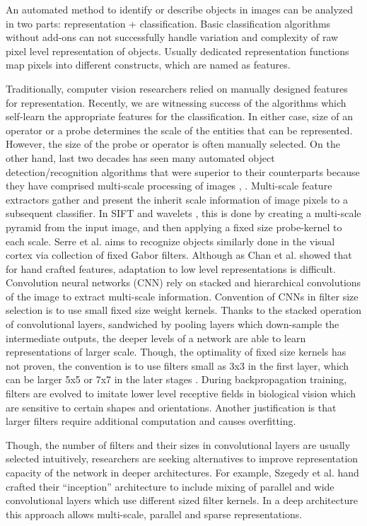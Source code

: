 \documentclass{bmvc2k}
\begin{document}
An automated method to identify or describe objects in images can be analyzed in two parts: representation + classification. Basic classification algorithms without add-ons can not successfully handle variation and complexity of raw pixel level representation of objects. Usually dedicated representation functions map pixels into different constructs, which are named as features.

Traditionally, computer vision researchers relied on manually designed features for representation. Recently, we are witnessing success of the algorithms which self-learn the appropriate features for the classification. In either case, size of an operator or a probe determines the scale of the entities that can be represented. However, the size of the probe or operator is often manually selected. On the other hand, last two decades has seen many automated object detection/recognition algorithms that were superior to their counterparts because they have comprised multi-scale processing of images \cite{dalal2005histograms}, \cite{lenet}. Multi-scale feature extractors gather and present the inherit scale information of image pixels to a subsequent classifier. In SIFT \cite{lowe} and wavelets \cite{mallat1992characterization}, this is done by creating a multi-scale pyramid from the input image, and then applying a fixed size probe-kernel to each scale. Serre et al. \cite{serre} aims to recognize objects similarly done in the visual cortex via collection of fixed Gabor filters. Although as Chan et al. \cite{pcanet} showed that for hand crafted features, adaptation to low level representations is difficult. Convolution neural networks (CNN) rely on stacked and hierarchical convolutions of the image to extract multi-scale information. Convention of CNNs in filter size selection is to use small fixed size weight kernels. Thanks to the stacked operation of convolutional layers, sandwiched by pooling layers which down-sample the intermediate outputs, the deeper levels of a network are able to learn representations of larger scale. Though, the optimality of fixed size kernels has not proven, the convention is to use filters small as 3x3 in the first layer, which can be larger 5x5 or 7x7 in the later stages \cite{Zeiler2014}. During backpropagation training, filters are evolved to imitate lower level receptive fields in biological vision which are sensitive to certain shapes and orientations. Another justification is that larger filters require additional computation and causes overfitting.

Though, the number of filters and their sizes in convolutional layers are usually selected intuitively, researchers are seeking alternatives to improve representation capacity of the network in deeper architectures. For example, Szegedy et al. \cite{inceptionv1} hand crafted their ``inception'' architecture to include mixing of parallel and wide convolutional layers which use different sized filter kernels. In a deep architecture this approach allows multi-scale, parallel and sparse representations.
\end{document}

